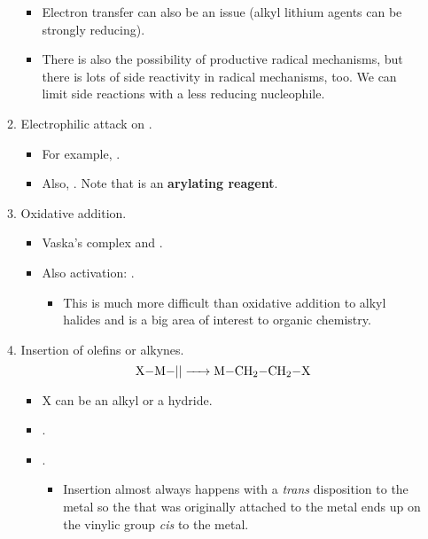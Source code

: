 \documentclass[../notes.tex]{subfiles}
\begin{document}
\begin{itemize}
\begin{enumerate}
\begin{itemize}
            \item Electron transfer can also be an issue (alkyl lithium agents can be strongly reducing).
            \item There is also the possibility of productive radical mechanisms, but there is lots of side reactivity in radical mechanisms, too. We can limit side reactions with a less reducing nucleophile.
        \end{itemize}
        \item Electrophilic attack on .
        \begin{itemize}
            \item For example, .
            \item Also, . Note that  is an \textbf{arylating reagent}.
        \end{itemize}
        \item Oxidative addition.
        \begin{itemize}
            \item Vaska's complex and .
            \item Also  activation: .
            \begin{itemize}
                \item This is much more difficult than oxidative addition to alkyl halides and is a big area of interest to organic chemistry.
            \end{itemize}
        \end{itemize}
        \item Insertion of olefins or alkynes.
        \begin{equation*}
            \ce{X-M-|| -> M-CH2-CH2-X}
        \end{equation*}
        \begin{itemize}
            \item X can be an alkyl or a hydride.
            \item {}.
            \item {}.
            \begin{itemize}
                \item Insertion almost always happens with a \emph{trans} disposition to the metal so the  that was originally attached to the metal ends up on the vinylic group \emph{cis} to the metal.
            \end{itemize}

\end{itemize}
\end{enumerate}
\end{itemize}
\end{document}
